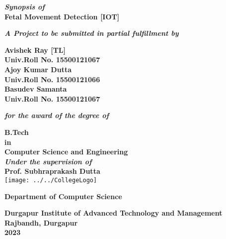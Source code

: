 \documentclass[12pt,a4paper,oneside]{report}
\begin{document}
	\thispagestyle{empty}
	\begin{center}
		{\textbf{\textit{Synopsis of}\\}}
		{\Large\bf{Fetal Movement Detection [IOT]} \\}
		
		
		\vspace{0.3in}
		
		
		{\textbf{\textit  {A Project to be submitted in partial fulfillment by\\}}}
		
		
		
		\vspace{0.4in}
		\textbf{\Large Avishek Ray [TL]
			\\ \small Univ.Roll No. 15500121067
			\\ \Large Ajoy Kumar Dutta
			\\ \small Univ.Roll No. 15500121066
			\\ \Large Basudev Samanta
			\\ \small Univ.Roll No. 15500121067\\}
		
		
		\vspace{0.3 in}
		
		{\bf\textit{for the award of the degree of}}
		
		\vspace {0.3 in}
		
		
		{\Large{\bf B.Tech \\ \small in \\\Large Computer Science and Engineering }\\}
		\vspace{0.3in}
		{\bf\textit{Under the supervision of\\ }}
		{\Large{\bf Prof. Subhraprakash Dutta}\\}    
		\vspace{0.3in}
\texttt{[image: ../../CollegeLogo]}
		
		
		{\large\bf Department of Computer Science\\}
		
		{\large\bf  Durgapur Institute of Advanced Technology and Management \\}
		{\large\bf Rajbandh, Durgapur \\}
		{\large\bf  2023 }
	\end{center}
	\date{}
	\setcounter{page}{0}
	
\end{document}
